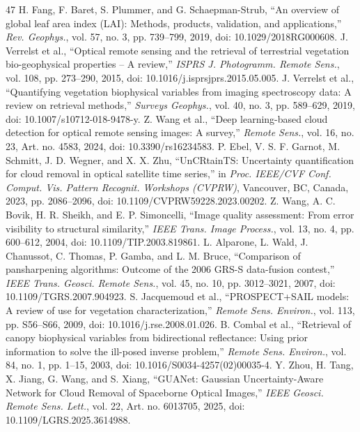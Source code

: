 \documentclass[a4paper,fleqn]{cas-dc}
\begin{document}
\begin{thebibliography}{47}
 H. Fang, F. Baret, S. Plummer, and G. Schaepman-Strub, ``An overview of global leaf area index (LAI): Methods, products, validation, and applications,'' \textit{Rev. Geophys.}, vol. 57, no. 3, pp. 739--799, 2019, doi: 10.1029/2018RG000608.
 J. Verrelst et al., ``Optical remote sensing and the retrieval of terrestrial vegetation bio-geophysical properties -- A review,'' \textit{ISPRS J. Photogramm. Remote Sens.}, vol. 108, pp. 273--290, 2015, doi: 10.1016/j.isprsjprs.2015.05.005.
 J. Verrelst et al., ``Quantifying vegetation biophysical variables from imaging spectroscopy data: A review on retrieval methods,'' \textit{Surveys Geophys.}, vol. 40, no. 3, pp. 589--629, 2019, doi: 10.1007/s10712-018-9478-y.
 Z. Wang et al., ``Deep learning-based cloud detection for optical remote sensing images: A survey,'' \textit{Remote Sens.}, vol. 16, no. 23, Art. no. 4583, 2024, doi: 10.3390/rs16234583.
 P. Ebel, V. S. F. Garnot, M. Schmitt, J. D. Wegner, and X. X. Zhu, ``UnCRtainTS: Uncertainty quantification for cloud removal in optical satellite time series,'' in \textit{Proc. IEEE/CVF Conf. Comput. Vis. Pattern Recognit. Workshops (CVPRW)}, Vancouver, BC, Canada, 2023, pp. 2086--2096, doi: 10.1109/CVPRW59228.2023.00202.
 Z. Wang, A. C. Bovik, H. R. Sheikh, and E. P. Simoncelli, ``Image quality assessment: From error visibility to structural similarity,'' \textit{IEEE Trans. Image Process.}, vol. 13, no. 4, pp. 600--612, 2004, doi: 10.1109/TIP.2003.819861.
 L. Alparone, L. Wald, J. Chanussot, C. Thomas, P. Gamba, and L. M. Bruce, ``Comparison of pansharpening algorithms: Outcome of the 2006 GRS-S data-fusion contest,'' \textit{IEEE Trans. Geosci. Remote Sens.}, vol. 45, no. 10, pp. 3012--3021, 2007, doi: 10.1109/TGRS.2007.904923.
 S. Jacquemoud et al., ``PROSPECT+SAIL models: A review of use for vegetation characterization,'' \textit{Remote Sens. Environ.}, vol. 113, pp. S56--S66, 2009, doi: 10.1016/j.rse.2008.01.026.
 B. Combal et al., ``Retrieval of canopy biophysical variables from bidirectional reflectance: Using prior information to solve the ill-posed inverse problem,'' \textit{Remote Sens. Environ.}, vol. 84, no. 1, pp. 1--15, 2003, doi: 10.1016/S0034-4257(02)00035-4.
 Y. Zhou, H. Tang, X. Jiang, G. Wang, and S. Xiang, ``GUANet: Gaussian Uncertainty-Aware Network for Cloud Removal of Spaceborne Optical Images,'' \textit{IEEE Geosci. Remote Sens. Lett.}, vol. 22, Art. no. 6013705, 2025, doi: 10.1109/LGRS.2025.3614988.

\end{thebibliography}
\end{document}
